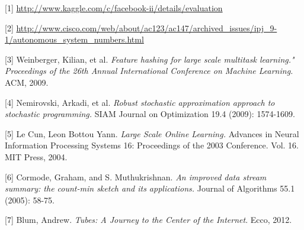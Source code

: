 \documentclass{article} %
\begin{document}
\small{
[1] \url{http://www.kaggle.com/c/facebook-ii/details/evaluation}

[2] \url{http://www.cisco.com/web/about/ac123/ac147/archived_issues/ipj_9-1/autonomous_system_numbers.html}

[3] Weinberger, Kilian, et al. {\it Feature hashing for large scale multitask learning." Proceedings of the 26th Annual International Conference on Machine Learning.} ACM, 2009.

[4] Nemirovski, Arkadi, et al. {\it Robust stochastic approximation approach to stochastic programming.} SIAM Journal on Optimization 19.4 (2009): 1574-1609.
}

[5] Le Cun, Leon Bottou Yann. {\it Large Scale Online Learning.} Advances in
Neural Information Processing Systems 16: Proceedings of the 2003
Conference. Vol. 16. MIT Press, 2004.

[6] Cormode, Graham, and S. Muthukrishnan. {\it An improved data stream
  summary: the count-min sketch and its applications.} Journal of Algorithms
55.1 (2005): 58-75. 

[7] Blum, Andrew. {\it Tubes: A Journey to the Center of the
  Internet}. Ecco, 2012.
\end{document}
